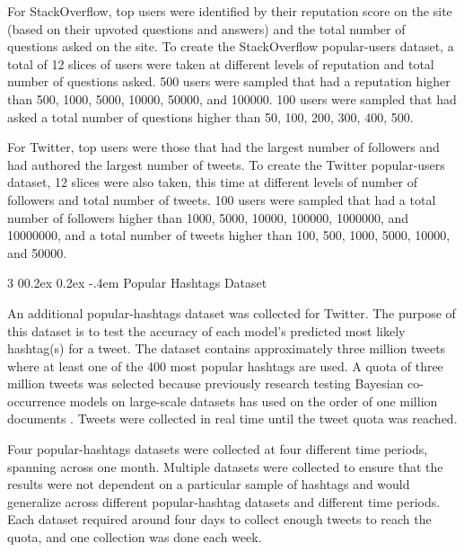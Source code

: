 \documentclass[man,floatsintext,donotrepeattitle]{apa6}
\makeatletter
\renewcommand{\subsubsection}{%
  \@startsection
  {subsubsection}%
  {3}%
  {\parindent}%
  {0\baselineskip \@plus 0.2ex \@minus 0.2ex}%
  {-.4em}%
  {\normalfont\normalsize\bfseries\addperi}}
\makeatother
\begin{document}
For StackOverflow, top users were identified by their reputation score on the site (based on their upvoted questions and answers) and the total number of questions asked on the site.
To create the StackOverflow popular-users dataset, a total of 12 slices of users were taken at different levels of reputation and total number of questions asked.
500 users were sampled that had a reputation higher than \num{500}, \num{1000}, \num{5000}, \num{10000}, \num{50000}, and \num{100000}.
100 users were sampled that had asked a total number of questions higher than \num{50}, \num{100}, \num{200}, \num{300}, \num{400}, \num{500}.

For Twitter, top users were those that had the largest number of followers and had authored the largest number of tweets.
To create the Twitter popular-users dataset, 12 slices were also taken, this time at different levels of number of followers and total number of tweets.
100 users were sampled that had a total number of followers higher than \num{1000}, \num{5000}, \num{10000}, \num{100000}, \num{1000000}, and \num{10000000},
and a total number of tweets higher than \num{100}, \num{500}, \num{1000}, \num{5000}, \num{10000}, and \num{50000}.

\subsubsection{Popular Hashtags Dataset}

An additional popular-hashtags dataset was collected for Twitter.
The purpose of this dataset is to test the accuracy of each model's predicted most likely hashtag(s) for a tweet.
The dataset contains approximately three million tweets where at least one of the 400 most popular hashtags are used.
A quota of three million tweets was selected because previously research testing Bayesian co-occurrence models on large-scale datasets has used on the order of one million documents
\parencites{Stanley2013,Douglass2010,Budiu2007,Kuo2011}.
Tweets were collected in real time until the tweet quota was reached.

Four popular-hashtags datasets were collected at four different time periods, spanning across one month.
Multiple datasets were collected to ensure that the results were not dependent on a particular sample of hashtags and would generalize across different popular-hashtag datasets and different time periods.
Each dataset required around four days to collect enough tweets to reach the quota, and one collection was done each week.
\end{document}
